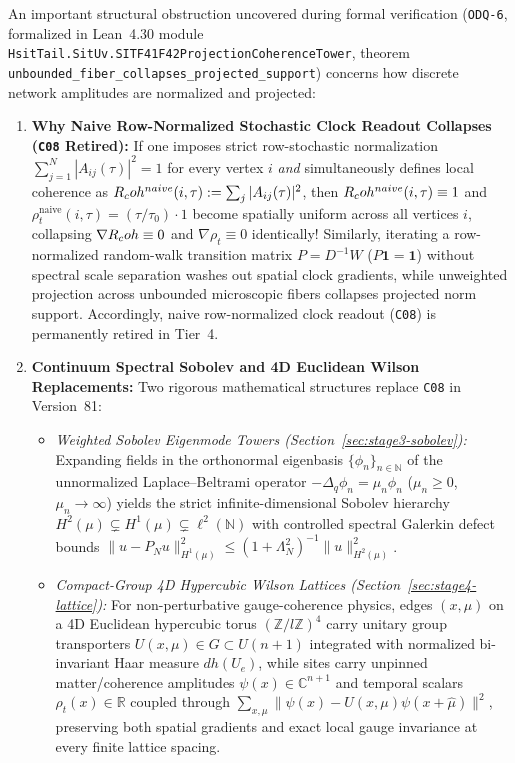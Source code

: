 An important structural obstruction uncovered during formal verification (\texttt{ODQ-6}, formalized in Lean~4.30 module \texttt{HsitTail.SitUv.SITF41F42ProjectionCoherenceTower}, theorem \texttt{unbounded\_fiber\_collapses\_projected\_support}) concerns how discrete network amplitudes are normalized and projected:
\begin{enumerate}[leftmargin=2em]
  \item \textbf{Why Naive Row-Normalized Stochastic Clock Readout Collapses (\texttt{C08} Retired):} If one imposes strict row-stochastic normalization $\sum_{j=1}^N |A_{ij}(\tau)|^2 = 1$ for every vertex $i$ \emph{and} simultaneously defines local coherence as $R_coh^{naive}(i,\tau) := \sum_j |A_{ij}(\tau)|^2$, then $R_coh^{naive}(i,\tau) \equiv 1$ and $\rho_t^{\mathrm{naive}}(i,\tau) = (\tau/\tau_0)\cdot 1$ become spatially uniform across all vertices $i$, collapsing $\nabla R_coh \equiv 0$ and $\nabla\rho_t \equiv 0$ identically! Similarly, iterating a row-normalized random-walk transition matrix $P = D^{-1}W$ ($P\mathbf{1} = \mathbf{1}$) without spectral scale separation washes out spatial clock gradients, while unweighted projection across unbounded microscopic fibers collapses projected norm support. Accordingly, naive row-normalized clock readout (\texttt{C08}) is permanently retired in Tier~4.
  \item \textbf{Continuum Spectral Sobolev and 4D Euclidean Wilson Replacements:} Two rigorous mathematical structures replace \texttt{C08} in Version~81:
  \begin{itemize}
    \item \emph{Weighted Sobolev Eigenmode Towers (Section~\ref{sec:stage3-sobolev}):} Expanding fields in the orthonormal eigenbasis $\{\phi_n\}_{n\in\mathbb{N}}$ of the unnormalized Laplace--Beltrami operator $-\Delta_q\phi_n = \mu_n\phi_n$ ($\mu_n \ge 0$, $\mu_n \to \infty$) yields the strict infinite-dimensional Sobolev hierarchy $H^2(\mu) \subsetneq H^1(\mu) \subsetneq \ell^2(\mathbb{N})$ with controlled spectral Galerkin defect bounds $\|u - P_N u\|_{H^1(\mu)}^2 \le (1 + \Lambda_N^2)^{-1}\|u\|_{H^2(\mu)}^2$.
    \item \emph{Compact-Group 4D Hypercubic Wilson Lattices (Section~\ref{sec:stage4-lattice}):} For non-perturbative gauge-coherence physics, edges $(x,\mu)$ on a 4D Euclidean hypercubic torus $(\mathbb{Z}/l\mathbb{Z})^4$ carry unitary group transporters $U(x,\mu) \in G \subset U(n+1)$ integrated with normalized bi-invariant Haar measure $dh(U_e)$, while sites carry unpinned matter/coherence amplitudes $\psi(x) \in \mathbb{C}^{n+1}$ and temporal scalars $\rho_t(x) \in \mathbb{R}$ coupled through $\sum_{x,\mu}\|\psi(x) - U(x,\mu)\psi(x+\hat{\mu})\|^2$, preserving both spatial gradients and exact local gauge invariance at every finite lattice spacing.
  \end{itemize}
\end{enumerate}

